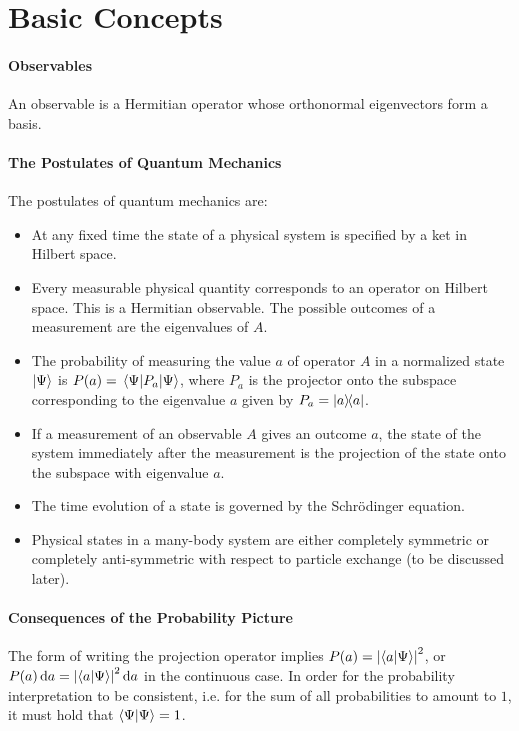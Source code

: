 \section{Basic Concepts}

\paragraph{Observables}
An observable is a Hermitian operator whose orthonormal eigenvectors form a basis.

\paragraph{The Postulates of Quantum Mechanics}
The postulates of quantum mechanics are:
\begin{itemize}
	\item At any fixed time the state of a physical system is specified by a ket in Hilbert space.
	\item Every measurable physical quantity corresponds to an operator on Hilbert space. This is a Hermitian observable. The possible outcomes of a measurement are the eigenvalues of $A$.
	\item The probability of measuring the value $a$ of operator $A$ in a normalized state $\ket{\Psi}$ is $P(a) = \expval{P_{a}}{\Psi}$, where $P_{a}$ is the projector onto the subspace corresponding to the eigenvalue $a$ given by $P_{a} = \dyad{a}{a}$.
	\item If a measurement of an observable $A$ gives an outcome $a$, the state of the system immediately after the measurement is the projection of the state onto the subspace with eigenvalue $a$.
	\item The time evolution of a state is governed by the Schrödinger equation.
	\item Physical states in a many-body system are either completely symmetric or completely anti-symmetric with respect to particle exchange (to be discussed later).
\end{itemize}

\paragraph{Consequences of the Probability Picture}
The form of writing the projection operator implies $P(a) = \abs{\bra{a}\ket{\Psi}}^{2}$, or $P(a)\dd{a} = \abs{\bra{a}\ket{\Psi}}^{2}\dd{a}$ in the continuous case. In order for the probability interpretation to be consistent, i.e. for the sum of all probabilities to amount to $1$, it must hold that $\bra{\Psi}\ket{\Psi} = 1$.


